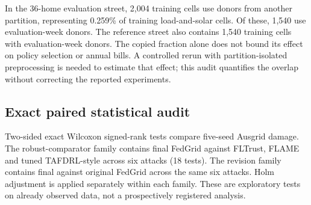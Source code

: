 \documentclass[preprint,12pt,a4paper]{elsarticle}
\begin{document}
In the 36-home evaluation street, 2,004 training cells use donors from another partition, representing 0.259\% of training load-and-solar cells. Of these, 1,540 use evaluation-week donors. The reference street also contains 1,540 training cells with evaluation-week donors. The copied fraction alone does not bound its effect on policy selection or annual bills. A controlled rerun with partition-isolated preprocessing is needed to estimate that effect; this audit quantifies the overlap without correcting the reported experiments.

\begin{table}[htbp]
\centering\small
\caption{Read-only ACT imputation donor audit for the 36-home evaluation and reference streets. Counts pool load and solar half-hour cells. Cross-partition percentages use all profile cells in the recipient partition, not only filled cells. Copied evaluation data are a qualification of the existing evidence; no policy rerun is implied.}
\label{tab:imputation_audit}
\end{table}



\subsection{Exact paired statistical audit}
Two-sided exact Wilcoxon signed-rank tests compare five-seed Ausgrid damage. The robust-comparator family contains final FedGrid against FLTrust, FLAME and tuned TAFDRL-style across six attacks (18 tests). The revision family contains final against original FedGrid across the same six attacks. Holm adjustment is applied separately within each family. These are exploratory tests on already observed data, not a prospectively registered analysis.
\end{document}
